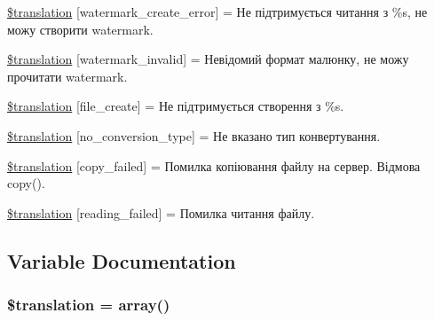 \begin{DoxyCompactItemize}
\hyperlink{class_8upload_8uk___u_a_8php_aabca0b65dadbc6184415c16375f284ca}{\$translation} \mbox{[}\textquotesingle{}watermark\+\_\+create\+\_\+error\textquotesingle{}\mbox{]} = \textquotesingle{}Не підтримується читання з \%s, не можу створити watermark.\textquotesingle{}
\item 
\hyperlink{class_8upload_8uk___u_a_8php_ac336e7a5701e47ba4a05e9e498a3cc44}{\$translation} \mbox{[}\textquotesingle{}watermark\+\_\+invalid\textquotesingle{}\mbox{]} = \textquotesingle{}Невідомий формат малюнку, не можу прочитати watermark.\textquotesingle{}
\item 
\hyperlink{class_8upload_8uk___u_a_8php_a1ecb4673e4fb69e06b3f20b65cecf30a}{\$translation} \mbox{[}\textquotesingle{}file\+\_\+create\textquotesingle{}\mbox{]} = \textquotesingle{}Не підтримується створення з \%s.\textquotesingle{}
\item 
\hyperlink{class_8upload_8uk___u_a_8php_a4712d7ec28e9a7f17eb3338af2358363}{\$translation} \mbox{[}\textquotesingle{}no\+\_\+conversion\+\_\+type\textquotesingle{}\mbox{]} = \textquotesingle{}Не вказано тип конвертування.\textquotesingle{}
\item 
\hyperlink{class_8upload_8uk___u_a_8php_a783c9358bcf54a054545b50098bc679b}{\$translation} \mbox{[}\textquotesingle{}copy\+\_\+failed\textquotesingle{}\mbox{]} = \textquotesingle{}Помилка копіювання файлу на сервер. Відмова copy().\textquotesingle{}
\item 
\hyperlink{class_8upload_8uk___u_a_8php_a01bea14c9fd5f353f62db44beabfcd42}{\$translation} \mbox{[}\textquotesingle{}reading\+\_\+failed\textquotesingle{}\mbox{]} = \textquotesingle{}Помилка читання файлу.\textquotesingle{}
\end{DoxyCompactItemize}


\subsection{Variable Documentation}
\hypertarget{class_8upload_8uk___u_a_8php_a1f198d410fecc3871ebdd468d343a5e3}{}
\subsubsection[{\$translation}]{\setlength{\rightskip}{0pt plus 5cm}\$translation = array()}\label{class_8upload_8uk___u_a_8php_a1f198d410fecc3871ebdd468d343a5e3}
\hypertarget{class_8upload_8uk___u_a_8php_ac7498e49b9771b04698029aa61c70821}{}
